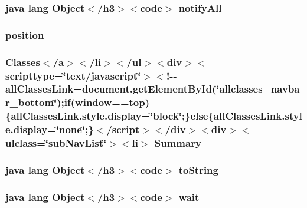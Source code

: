\hypertarget{_stations_list_adapter_8html_a1279357e6e09e33e75b55eb05fdb6436}{
\subsubsection[{notify\-All}]{\setlength{\rightskip}{0pt plus 5cm}java lang Object$<$/h3$>$$<$code$>$ notify\-All}}\label{_stations_list_adapter_8html_a1279357e6e09e33e75b55eb05fdb6436}
\hypertarget{_stations_list_adapter_8html_a7130b1618285588513fd1ff97884b9d9}{
\subsubsection[{position}]{\setlength{\rightskip}{0pt plus 5cm}position}}\label{_stations_list_adapter_8html_a7130b1618285588513fd1ff97884b9d9}
\hypertarget{_stations_list_adapter_8html_a6f9ab45abc9b0679dc1b132fbacfc681}{
\subsubsection[{Summary}]{\setlength{\rightskip}{0pt plus 5cm}Classes$<$/{\bf a}$>$$<$/li$>$$<$/ul$>$$<$div$>$$<$scripttype=\char`\"{}text/javascript\char`\"{}$>$$<$!-\/-\/all\-Classes\-Link=document.\-get\-Element\-By\-Id(\char`\"{}allclasses\-\_\-navbar\-\_\-bottom\char`\"{});if(window==top)\{all\-Classes\-Link.\-style.\-display=\char`\"{}block\char`\"{};\}else\{all\-Classes\-Link.\-style.\-display=\char`\"{}none\char`\"{};\}$<$/script$>$$<$/div$>$$<$div$>$$<$ulclass=\char`\"{}sub\-Nav\-List\char`\"{}$>$$<$li$>$ Summary}}\label{_stations_list_adapter_8html_a6f9ab45abc9b0679dc1b132fbacfc681}
\hypertarget{_stations_list_adapter_8html_a36e8a76a4132c9a7081416f27d087615}{
\subsubsection[{to\-String}]{\setlength{\rightskip}{0pt plus 5cm}java lang Object$<$/h3$>$$<$code$>$ to\-String}}\label{_stations_list_adapter_8html_a36e8a76a4132c9a7081416f27d087615}
\hypertarget{_stations_list_adapter_8html_a9a9f0c22e5688d478c707f910f1c1aea}{
\subsubsection[{wait}]{\setlength{\rightskip}{0pt plus 5cm}java lang Object$<$/h3$>$$<$code$>$ wait}}\label{_stations_list_adapter_8html_a9a9f0c22e5688d478c707f910f1c1aea}
